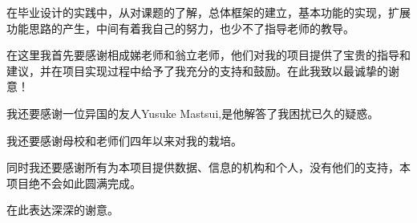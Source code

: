 
\acknowledgement

 
在毕业设计的实践中，从对课题的了解，总体框架的建立，基本功能的实现，扩展功能思路的产生，中间有着我自己的努力，也少不了指导老师的教导。

在这里我首先要感谢相成娣老师和翁立老师，他们对我的项目提供了宝贵的指导和建议，并在项目实现过程中给予了我充分的支持和鼓励。在此我致以最诚挚的谢意！

我还要感谢一位异国的友人Yusuke Mastsui,是他解答了我困扰已久的疑惑。

我还要感谢母校和老师们四年以来对我的栽培。

同时我还要感谢所有为本项目提供数据、信息的机构和个人，没有他们的支持，本项目绝不会如此圆满完成。

在此表达深深的谢意。
